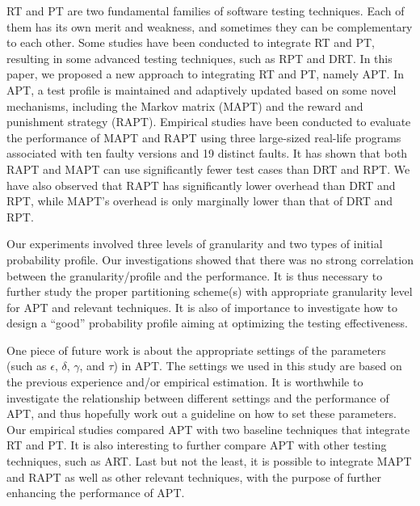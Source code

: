 \documentclass[10pt,journal,compsoc]{IEEEtran}
\begin{document}
RT and PT are two fundamental families of software testing techniques. Each of them has its own merit and weakness, and sometimes they can be complementary to each other. Some studies have been conducted to integrate RT and PT, resulting in some advanced testing techniques, such as RPT and DRT. In this paper, we proposed a new approach to integrating RT and PT, namely APT. In APT, a test profile is maintained and adaptively updated based on some novel mechanisms, including the Markov matrix (MAPT) and the reward and punishment strategy (RAPT). Empirical studies have been conducted to evaluate the performance of MAPT and RAPT using three large-sized real-life programs associated with ten faulty versions and 19 distinct faults. It has shown that both RAPT and MAPT can use significantly fewer test cases than DRT and RPT. We have also observed that RAPT has significantly lower overhead than DRT and RPT, while MAPT's overhead is only marginally lower than that of DRT and RPT.

Our experiments involved three levels of granularity and two types of initial probability profile. Our investigations showed that there was no strong correlation between the granularity/profile and the performance. It is thus necessary to further study the proper partitioning scheme(s) with appropriate granularity level for APT and relevant techniques. It is also of importance to investigate how to design a ``good'' probability profile aiming at optimizing the testing effectiveness.

One piece of future work is about the appropriate settings of the parameters (such as $\epsilon$, $\delta$, $\gamma$, and $\tau$) in APT. The settings we used in this study are based on the previous experience and/or empirical estimation. It is worthwhile to investigate the relationship between different settings and the performance of APT, and thus hopefully work out a guideline on how to set these parameters. Our empirical studies compared APT with two baseline techniques that integrate RT and PT. It is also interesting to further compare APT with other testing techniques, such as ART. Last but not the least, it is possible to integrate MAPT and RAPT as well as other relevant techniques, with the purpose of further enhancing the performance of APT.

\end{document}
